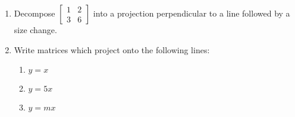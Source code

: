 \documentclass[../gatm.tex]{subfiles}
\begin{document}
\begin{enumerate}
\item Decompose $\left[\begin{smallmatrix} 1 & 2 \\ 3 & 6\end{smallmatrix}\right]$ into a projection perpendicular to a line followed by a size change.
\item Write matrices which project onto the following lines:
\begin{enumerate}
\item $y=x$
\item $y=5x$
\item $y=mx$
\end{enumerate}
\vspace{-10ex}
\end{enumerate}
\end{document}
